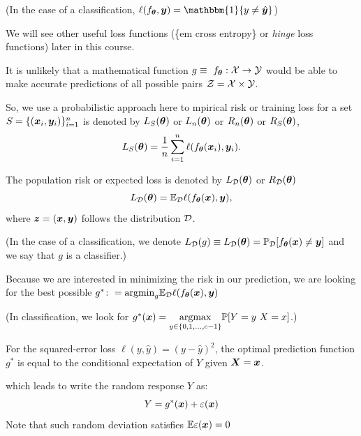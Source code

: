 \documentclass{beamer}
\begin{document}
\begin{frame}[allowframebreaks]
  (In the case of a classification, $\ell(f_{\vtheta},\vy)=\mathbbm{1}\{y\neq \hat{\vy}\}$)

We will see other useful loss functions (\{em cross entropy\} or {\em hinge} loss functions) later in this course.

It is unlikely that a mathematical function $g \equiv \ f_{\bm{\theta}}:\mathcal{X}\to\mathcal{Y}$ would be able to make accurate predictions of all possible pairs $\mathcal{Z}=\mathcal{X}\times\mathcal{Y}$.

  So, we use a probabilistic approach here to mpirical risk or training loss for a set $S=\{(\bm{x}_i,\bm{y}_i)\}_{i=1}^{n}$ is denoted by  $L_S(\bm{\theta})$ or $L_{n}(\bm{\theta})$ or $R_{n}(\bm{\theta})$ or $R_{S}(\bm{\theta})$,
  \begin{equation}
      L_S(\bm{\theta}) =\frac{1}{n}\sum_{i=1}^n\ell(f_{\bm{\theta}}(\bm{x}_i),\bm{y}_i).
  \end{equation}
  
  The population risk or expected loss is denoted by $L_{\mathcal{D}}(\bm{\theta})$ or $R_{\mathcal{D}}(\bm{\theta})$
  \begin{equation}
      L_{\mathcal{D}}(\bm{\theta}) =\mathbb{E}_{\mathcal{D}}\ell(f_{\bm{\theta}}(\bm{x}),\bm{y}),
  \end{equation}
  where $\bm{z}=(\bm{x},\bm{y})$ follows the distribution $\mathcal{D}$.
   
  (In the case of a classification, we denote $L_{\mathcal{D}}(g) \equiv L_{\mathcal{D}}(\bm{\theta}) = \mathbb{P}_{\mathcal{D}} [f_{\bm{\theta}}(\bm{x}) \neq \bm{y}]$ and we say that $g$ is a classifier.)

  Because we are interested in minimizing the risk in our prediction, we are looking for the best possible $g^* \colon = \mathrm{argmin}_g \mathbb{E}_{\mathcal{D}}\ell(f_{\bm{\theta}}(\bm{x}),\bm{y})$

  (In classification, we look for $g^* (\vx) = \underset{y\in\{0,1,\ldots,c-1\}}{\mathrm{argmax}}  \Prob[Y=y \ X=x]$.)

  \begin{theorem}
    For the squared-error loss $\ell (y,\hat{y})=(y-\hat{y})^2$, the optimal prediction function $g^*$ is equal to the conditional expectation of $Y$ given $\bm{X}=\bm{x}$.
  \end{theorem}
  which leads to write the random response $Y$ as:
  \[Y=g^*(\bm{x})+\varepsilon(\bm{x})\]
  Note that such random deviation satisfies $\mathbb{E} \varepsilon(\bm{x})=0$
\end{frame}


\end{document}
